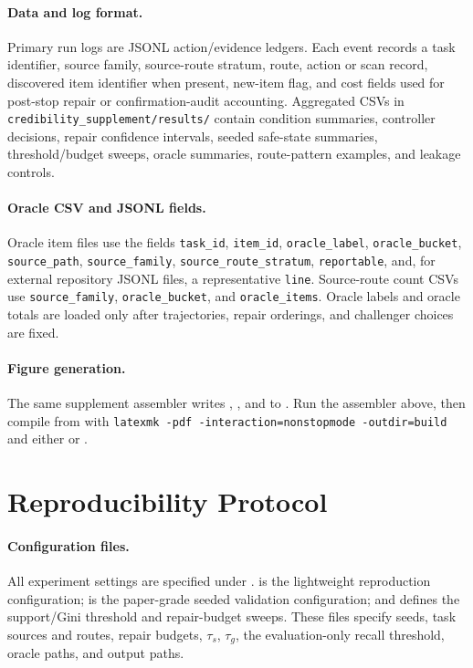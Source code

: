 \documentclass[letterpaper,10pt]{article}
\begin{document}
\paragraph{Data and log format.}
Primary run logs are JSONL action/evidence ledgers. Each event records a task
identifier, source family, source-route stratum, route, action or scan record,
discovered item identifier when present, new-item flag, and cost fields used for
post-stop repair or confirmation-audit accounting. Aggregated CSVs in
\texttt{credibility\_supplement/results/} contain condition summaries,
controller decisions, repair confidence intervals, seeded safe-state summaries,
threshold/budget sweeps, oracle summaries, route-pattern examples, and leakage
controls.

\paragraph{Oracle CSV and JSONL fields.}
Oracle item files use the fields
\texttt{task\_id}, \texttt{item\_id}, \texttt{oracle\_label},
\texttt{oracle\_bucket}, \texttt{source\_path}, \texttt{source\_family},
\texttt{source\_route\_stratum}, \texttt{reportable}, and, for external
repository JSONL files, a representative \texttt{line}. Source-route count CSVs
use \texttt{source\_family}, \texttt{oracle\_bucket}, and
\texttt{oracle\_items}. Oracle labels and oracle totals are loaded only after
trajectories, repair orderings, and challenger choices are fixed.

\paragraph{Figure generation.}
The same supplement assembler writes
, , and
 to . Run the
assembler above, then compile from  with \texttt{latexmk -pdf
-interaction=nonstopmode -outdir=build} and either
 or
.

\section*{Reproducibility Protocol}

\paragraph{Configuration files.}
All experiment settings are specified under .
 is the lightweight reproduction configuration;
 is the paper-grade seeded validation configuration;
and  defines the support/Gini threshold and repair-budget
sweeps. These files specify seeds, task sources and routes, repair budgets,
\(\tau_s\), \(\tau_g\), the evaluation-only recall threshold, oracle paths, and
output paths.
\end{document}
